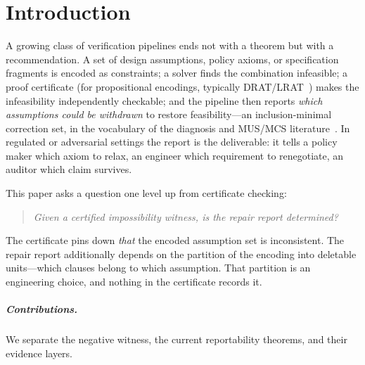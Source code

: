 \documentclass[sigplan,10pt,review,anonymous]{acmart}
\theoremstyle{acmdefinition}
\begin{document}
\section{Introduction}
\label{sec:intro}

A growing class of verification pipelines ends not with a theorem but with a
recommendation. A set of design assumptions, policy axioms, or specification
fragments is encoded as constraints; a solver finds the combination
infeasible; a proof certificate (for propositional encodings, typically
DRAT/LRAT~\cite{WetzlerHeuleHunt2014,CruzFilipe2017}) makes the
infeasibility independently checkable; and the pipeline then reports
\emph{which assumptions could be withdrawn} to restore feasibility---an
inclusion-minimal correction set, in the vocabulary of the diagnosis and
MUS/MCS literature~\cite{Reiter1987,LiffitonSakallah2008}. In regulated or
adversarial settings the report is the deliverable: it tells a policy maker
which axiom to relax, an engineer which requirement to renegotiate, an auditor
which claim survives.

This paper asks a question one level up from certificate checking:
\begin{quote}
\emph{Given a certified impossibility witness, is the repair report
determined?}
\end{quote}
The certificate pins down \emph{that} the encoded assumption set is
inconsistent. The repair report additionally depends on the partition of the
encoding into deletable units---which clauses belong to which assumption. That
partition is an engineering choice, and nothing in the certificate records it.

\subparagraph*{Contributions.} We separate the negative witness, the current
reportability theorems, and their evidence layers.
\end{document}
